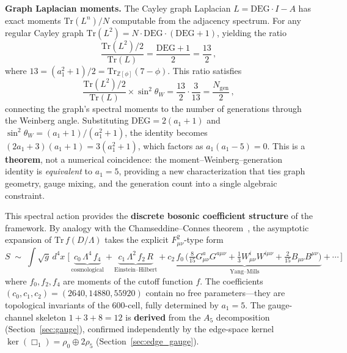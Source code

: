 \documentclass[12pt,a4paper]{article}
\theoremstyle{definition}
\begin{document}
\textbf{Graph Laplacian moments.}  The Cayley graph Laplacian $L = \mathrm{DEG}\cdot I - A$ has exact moments $\mathrm{Tr}(L^n)/N$ computable from the adjacency spectrum.  For any regular Cayley graph $\mathrm{Tr}(L^2) = N\cdot\mathrm{DEG}\cdot(\mathrm{DEG}+1)$, yielding the ratio
\begin{equation}
\frac{\mathrm{Tr}(L^2)/2}{\mathrm{Tr}(L)} = \frac{\mathrm{DEG}+1}{2} = \frac{13}{2}\,,
\end{equation}
where $13 = (a_1^2+1)/2 = \mathrm{Tr}_{\mathbb{Z}[\phi]}(7-\phi)$.  This ratio satisfies
\begin{equation}
\frac{\mathrm{Tr}(L^2)/2}{\mathrm{Tr}(L)} \times \sin^2\theta_W = \frac{13}{2}\cdot\frac{3}{13} = \frac{N_{\mathrm{gen}}}{2}\,,
\label{eq:moment_weinberg}
\end{equation}
connecting the graph's spectral moments to the number of generations through the Weinberg angle.  Substituting $\mathrm{DEG} = 2(a_1\!+\!1)$ and $\sin^2\theta_W = (a_1\!+\!1)/(a_1^2\!+\!1)$, the identity becomes $(2a_1\!+\!3)(a_1\!+\!1) = 3(a_1^2\!+\!1)$, which factors as $a_1(a_1 - 5) = 0$.  This is a \textbf{theorem}, not a numerical coincidence: the moment--Weinberg--generation identity is \emph{equivalent} to $a_1 = 5$, providing a new characterization that ties graph geometry, gauge mixing, and the generation count into a single algebraic constraint.

This spectral action provides the \textbf{discrete bosonic coefficient structure} of the framework.  By analogy with the Chamseddine--Connes theorem~\cite{chamseddine1997}, the asymptotic expansion of $\mathrm{Tr}\,f(D/\Lambda)$ takes the explicit $F_{\mu\nu}^2$-type form
\begin{equation}
S \;\sim\; \int\!\sqrt{g}\,d^4x\;\Big[\, \underbrace{c_0\,\Lambda^4\,f_4}_{\text{cosmological}} + \underbrace{c_1\,\Lambda^2\,f_2\,R}_{\text{Einstein--Hilbert}} + \underbrace{c_2\,f_0\,\big(\tfrac{8}{15}G^a_{\mu\nu}G^{a\mu\nu} + \tfrac{1}{3}W^i_{\mu\nu}W^{i\mu\nu} + \tfrac{2}{15}B_{\mu\nu}B^{\mu\nu}\big)}_{\text{Yang--Mills}} + \cdots\,\Big]
\label{eq:lagrangian_explicit}
\end{equation}
where $f_0, f_2, f_4$ are moments of the cutoff function $f$. The coefficients $(c_0, c_1, c_2) = (2640, 14880, 55920)$ contain no free parameters---they are topological invariants of the 600-cell, fully determined by $a_1 = 5$.  The gauge-channel skeleton $1 + 3 + 8 = 12$ is \textbf{derived} from the $A_5$ decomposition (Section~\ref{sec:gauge}), confirmed independently by the edge-space kernel $\ker(\Box_1) = \rho_0 \oplus 2\rho_5$ (Section~\ref{sec:edge_gauge}).
\end{document}
